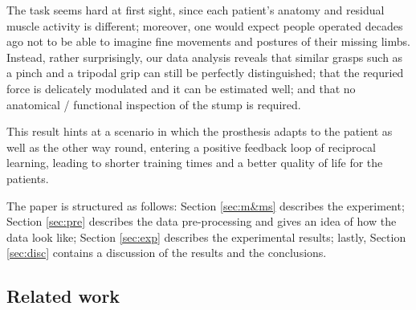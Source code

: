 The task seems hard at first sight, since each patient's anatomy and residual
muscle activity is different; moreover, one would expect people operated
decades ago not to be able to imagine fine movements and postures of their
missing limbs. Instead, rather surprisingly, our data analysis reveals that
similar grasps such as a pinch and a tripodal grip can still be perfectly
distinguished; that the requried force is delicately modulated and it can be
estimated well; and that no anatomical / functional inspection of the stump
is required.

This result hints at a scenario in which the prosthesis adapts to the patient
as well as the other way round, entering a positive feedback loop
of reciprocal learning, leading to shorter training times and a better
quality of life for the patients.

The paper is structured as follows: Section \ref{sec:m&ms} describes
the experiment; Section \ref{sec:pre} describes the data
pre-processing and gives an idea of how the data look like; Section
\ref{sec:exp} describes the experimental results; lastly, Section
\ref{sec:disc} contains a discussion of the results and the conclusions.

\subsection{Related work}
